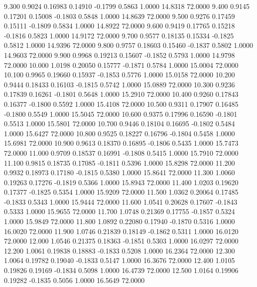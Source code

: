    9.300   0.9024   0.16983   0.14910  -0.1799   0.5863   1.0000  14.8318  72.0000
   9.400   0.9145   0.17201   0.15008  -0.1803   0.5848   1.0000  14.8639  72.0000
   9.500   0.9276   0.17459   0.15111  -0.1809   0.5834   1.0000  14.8922  72.0000
   9.600   0.9419   0.17765   0.15218  -0.1816   0.5823   1.0000  14.9172  72.0000
   9.700   0.9577   0.18135   0.15334  -0.1825   0.5812   1.0000  14.9396  72.0000
   9.800   0.9757   0.18603   0.15460  -0.1837   0.5802   1.0000  14.9603  72.0000
   9.900   0.9968   0.19213   0.15607  -0.1852   0.5793   1.0000  14.9798  72.0000
  10.000   1.0198   0.20050   0.15777  -0.1871   0.5784   1.0000  15.0004  72.0000
  10.100   0.9965   0.19660   0.15937  -0.1853   0.5776   1.0000  15.0158  72.0000
  10.200   0.9444   0.18433   0.16103  -0.1815   0.5742   1.0000  15.0889  72.0000
  10.300   0.9236   0.17839   0.16261  -0.1801   0.5648   1.0000  15.2910  72.0000
  10.400   0.9260   0.17843   0.16377  -0.1800   0.5592   1.0000  15.4108  72.0000
  10.500   0.9311   0.17907   0.16485  -0.1800   0.5549   1.0000  15.5045  72.0000
  10.600   0.9375   0.17996   0.16590  -0.1801   0.5513   1.0000  15.5801  72.0000
  10.700   0.9446   0.18104   0.16695  -0.1802   0.5484   1.0000  15.6427  72.0000
  10.800   0.9525   0.18227   0.16796  -0.1804   0.5458   1.0000  15.6981  72.0000
  10.900   0.9613   0.18370   0.16895  -0.1806   0.5435   1.0000  15.7473  72.0000
  11.000   0.9709   0.18537   0.16991  -0.1808   0.5415   1.0000  15.7910  72.0000
  11.100   0.9815   0.18735   0.17085  -0.1811   0.5396   1.0000  15.8298  72.0000
  11.200   0.9932   0.18973   0.17180  -0.1815   0.5380   1.0000  15.8641  72.0000
  11.300   1.0060   0.19263   0.17276  -0.1819   0.5366   1.0000  15.8943  72.0000
  11.400   1.0203   0.19620   0.17377  -0.1825   0.5354   1.0000  15.9209  72.0000
  11.500   1.0362   0.20064   0.17485  -0.1833   0.5343   1.0000  15.9444  72.0000
  11.600   1.0541   0.20628   0.17607  -0.1843   0.5333   1.0000  15.9655  72.0000
  11.700   1.0748   0.21369   0.17755  -0.1857   0.5324   1.0000  15.9849  72.0000
  11.800   1.0892   0.22080   0.17940  -0.1870   0.5316   1.0000  16.0020  72.0000
  11.900   1.0746   0.21839   0.18149  -0.1862   0.5311   1.0000  16.0120  72.0000
  12.000   1.0546   0.21375   0.18363  -0.1851   0.5303   1.0000  16.0297  72.0000
  12.200   1.0061   0.19838   0.18883  -0.1833   0.5208   1.0000  16.2364  72.0000
  12.300   1.0064   0.19782   0.19040  -0.1833   0.5147   1.0000  16.3676  72.0000
  12.400   1.0105   0.19826   0.19169  -0.1834   0.5098   1.0000  16.4739  72.0000
  12.500   1.0164   0.19906   0.19282  -0.1835   0.5056   1.0000  16.5649  72.0000
